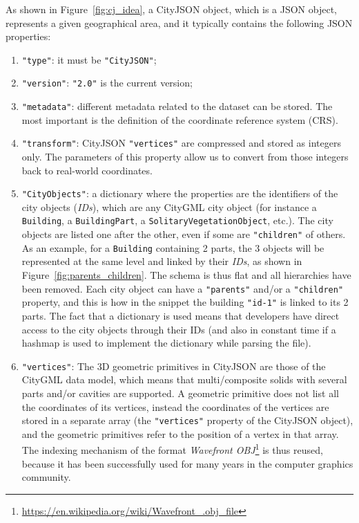 \documentclass{isprs} %
\begin{document}
As shown in Figure~\ref{fig:cj_idea}, a CityJSON object, which is a JSON object, represents a given geographical area, and it typically contains the following JSON properties: 
\begin{enumerate}
  \item \texttt{"type"}: it must be \texttt{"CityJSON"};
  \item \texttt{"version"}: \texttt{"2.0"} is the current version;
  \item \texttt{"metadata"}: different metadata related to the dataset can be stored. The most important is the definition of the coordinate reference system (CRS).
  \item \texttt{"transform"}: CityJSON \texttt{"vertices"} are compressed and stored as integers only. The parameters of this property allow us to convert from those integers back to real-world coordinates.
  \item \texttt{"CityObjects"}: a dictionary where the properties are the identifiers of the city objects (\emph{IDs}), which are any CityGML city object (for instance a \texttt{Building}, a \texttt{BuildingPart}, a \texttt{SolitaryVegetationObject}, etc.).
  The city objects are listed one after the other, even if some are \texttt{"children"} of others.
  As an example, for a \texttt{Building} containing 2 parts, the 3 objects will be represented at the same level and linked by their \emph{IDs}, as shown in Figure~\ref{fig:parents_children}.
  The schema is thus flat and all hierarchies have been removed.
  Each city object can have a \texttt{"parents"} and/or a \texttt{"children"} property, and this is how in the snippet the building \texttt{"id-1"} is linked to its 2 parts.
  The fact that a dictionary is used means that developers have direct access to the city objects through their IDs (and also in constant time if a hashmap is used to implement the dictionary while parsing the file).
  \item \texttt{"vertices"}: The 3D geometric primitives in CityJSON are those of the CityGML data model, which means that multi/composite solids with several parts and/or cavities are supported.
  A geometric primitive does not list all the coordinates of its vertices, instead the coordinates of the vertices are stored in a separate array (the \texttt{"vertices"} property of the CityJSON object), and the geometric primitives refer to the position of a vertex in that array.
  The indexing mechanism of the format \emph{Wavefront OBJ}\footnote{\url{https://en.wikipedia.org/wiki/Wavefront_.obj_file}} is thus reused, because it has been successfully used for many years in the computer graphics community.

\end{enumerate}
\end{document}
